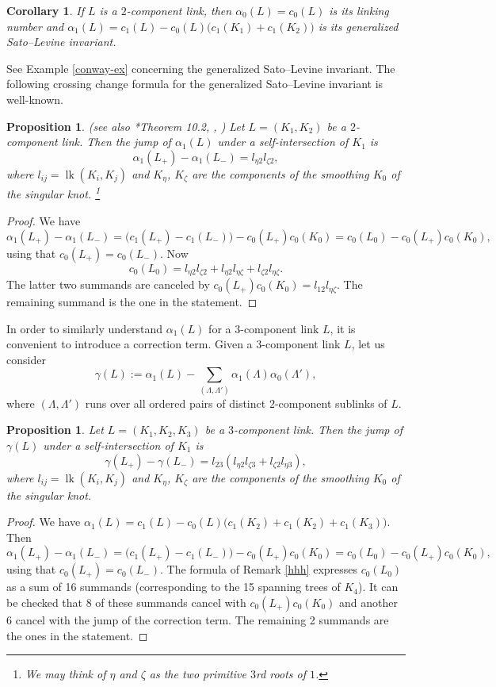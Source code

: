 \documentclass[a4paper,12pt,reqno,oneside]{amsart} %
\theoremstyle{plain}
\newtheorem{proposition}[theorem]{Proposition}
\newtheorem{corollary}[theorem]{Corollary}
\theoremstyle{definition}
\theoremstyle{named}
\renewcommand{\:}{\colon}
\DeclareMathOperator{\lk}{lk}
\begin{document}
\begin{corollary} If $L$ is a $2$-component link, then $\alpha_0(L)=c_0(L)$ is its linking number and 
$\alpha_1(L)=c_1(L)-c_0(L)\big(c_1(K_1)+c_1(K_2)\big)$ is its generalized Sato--Levine invariant.
\end{corollary}

See Example \ref{conway-ex} concerning the generalized Sato--Levine invariant.
The following crossing change formula for the generalized Sato--Levine invariant is well-known.

\begin{proposition} \label{beta-jump} {\rm \cite{Liv} (see also \cite{Tr2}*{Theorem 10.2}, \cite{KL}, \cite{AR})}
Let $L=(K_1,K_2)$ be a $2$-component link. 
Then the jump of $\alpha_1(L)$ under a self-intersection of $K_1$ is 
\[\alpha_1(L_+)-\alpha_1(L_-)=l_{\eta2}l_{\zeta2},\]
where $l_{ij}=\lk(K_i,K_j)$ and $K_\eta$, $K_\zeta$ are the components of the smoothing $K_0$ of the singular knot.%
\footnote{We may think of $\eta$ and $\zeta$ as the two primitive $3$rd roots of $1$.}
\end{proposition}

\begin{proof} We have 
\[\alpha_1(L_+)-\alpha_1(L_-)=\big(c_1(L_+)-c_1(L_-)\big)-c_0(L_+)c_0(K_0)=c_0(L_0)-c_0(L_+)c_0(K_0),\]
using that $c_0(L_+)=c_0(L_-)$.
Now \[c_0(L_0)=l_{\eta2}l_{\zeta2}+l_{\eta2}l_{\eta\zeta}+l_{\zeta2}l_{\eta\zeta}.\]
The latter two summands are canceled by $c_0(L_+)c_0(K_0)=l_{12}l_{\eta\zeta}$.
The remaining summand is the one in the statement.
\end{proof}

In order to similarly understand $\alpha_1(L)$ for a $3$-component link $L$, it is convenient to introduce a correction term.
Given a $3$-component link $L$, let us consider \[\gamma(L):=\alpha_1(L)-\sum_{(\Lambda,\Lambda')}\alpha_1(\Lambda)\alpha_0(\Lambda'),\]
where $(\Lambda,\Lambda')$ runs over all ordered pairs of distinct $2$-component sublinks of $L$.

\begin{proposition} \label{gamma} Let $L=(K_1,K_2,K_3)$ be a $3$-component link. 
Then the jump of $\gamma(L)$ under a self-intersection of $K_1$ is 
\[\gamma(L_+)-\gamma(L_-)=l_{23}(l_{\eta2}l_{\zeta3}+l_{\zeta2}l_{\eta3}),\]
where $l_{ij}=\lk(K_i,K_j)$ and $K_\eta$, $K_\zeta$ are the components of the smoothing $K_0$ of the singular knot.
\end{proposition}

\begin{proof} We have $\alpha_1(L)=c_1(L)-c_0(L)\big(c_1(K_2)+c_1(K_2)+c_1(K_3)\big)$.
Then 
\[\alpha_1(L_+)-\alpha_1(L_-)=\big(c_1(L_+)-c_1(L_-)\big)-c_0(L_+)c_0(K_0)=c_0(L_0)-c_0(L_+)c_0(K_0),\]
using that $c_0(L_+)=c_0(L_-)$.
The formula of Remark \ref{hhh} expresses $c_0(L_0)$ as a sum of 16 summands (corresponding to the 15 spanning trees of $K_4$).
It can be checked that 8 of these summands cancel with $c_0(L_+)c_0(K_0)$ and another 6 cancel with the jump of
the correction term.
The remaining 2 summands are the ones in the statement.
\end{proof} 
\end{document}
